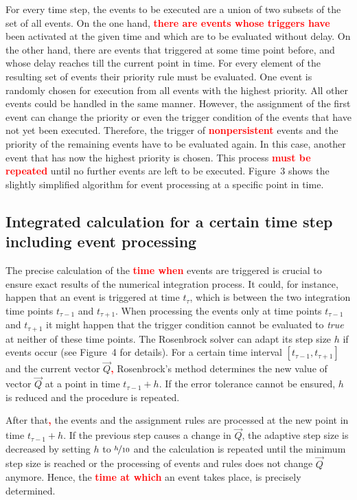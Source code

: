 \documentclass[10pt]{bmc_article}
\newenvironment{bmcformat}{\baselineskip20pt\sloppy\setboolean{publ}{false}}{\baselineskip20pt\sloppy}
\newcommand{\TODO}[1]{\textcolor{red}{\textbf{#1}}}
\newcommand{\true}{\emph{true}}
\begin{document}
\begin{bmcformat}
For every time step, the events to be executed are a union of two subsets of the set of all events.
On the one hand, \TODO{there are events whose triggers have} been activated at the given time and which are to be evaluated without delay.
On the other hand, there are events that triggered at some time point before, and whose delay reaches till the current point in time.
For every element of the resulting set of events their priority rule must be evaluated.
One event is randomly chosen for execution from all events with the highest priority.
All other events could be handled in the same manner.
However, the assignment of the first event can change the priority or even the trigger condition of the events that have not yet been executed.
Therefore, the trigger of \TODO{nonpersistent} events and the priority of the remaining events have to be evaluated again.
In this case, another event that has now the highest priority is chosen.
This process \TODO{must be repeated} until no further events are left to be executed.
Figure~3 shows the slightly simplified algorithm for event processing at a specific point in time.

\subsection*{Integrated calculation for a certain time step including event processing}
The precise calculation of the \TODO{time when} events are triggered is crucial to 
ensure exact results of the numerical integration process.
It could, for instance, happen that an event is triggered at time $t_{\tau}$,
which is between the two integration time points $t_{\tau - 1}$ and $t_{\tau + 1}$.
When processing the events only at time points $t_{\tau - 1}$ and $t_{\tau + 1}$
it might happen that the trigger condition cannot be evaluated to \true{} at
neither of these time points. 
The Rosenbrock solver \cite{Press1993} can adapt its step size $h$ if events
occur (see Figure~4 for details).
For a certain time interval $[t_{\tau - 1}, t_{\tau + 1}]$ and the current vector
$\vec{Q}$\TODO{,} Rosenbrock's method determines the new value of vector $\vec{Q}$ at a
point in time $t_{\tau - 1} + h$.
If the error tolerance cannot be ensured, $h$ is reduced and the procedure is
repeated.

After that\TODO{,} the events and the assignment rules are processed at the new point in
time $t_{\tau - 1} + h$.
If the previous step causes a change in $\vec{Q}$, the adaptive step size is
decreased by setting $h$ to $\nicefrac{h}{10}$ and the calculation is repeated
until the minimum step size is reached or the processing of events and rules
does not change $\vec{Q}$ anymore.
Hence, the \TODO{time at which} an event takes place, is precisely determined.


\end{bmcformat}
\end{document}
